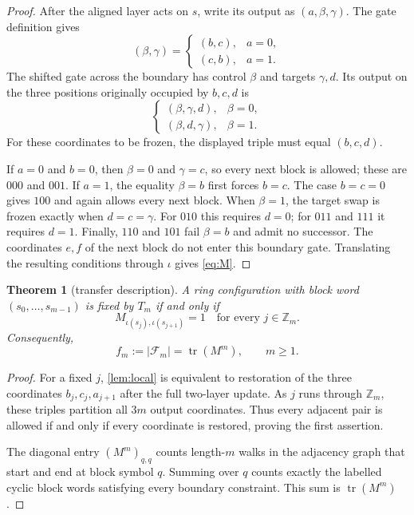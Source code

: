 \documentclass[11pt,a4paper]{amsart}
\newtheorem{theorem}{Theorem}[section]
\theoremstyle{definition}
\theoremstyle{remark}
\newcommand{\tr}{\operatorname{tr}}
\newcommand{\Fset}{\mathcal F}
\begin{document}
\begin{proof}
After the aligned layer acts on $s$, write its output as
$(a,\beta,\gamma)$.  The gate definition gives
\[
 (\beta,\gamma)=
 \begin{cases}
  (b,c),&a=0,\\
  (c,b),&a=1.
 \end{cases}
\]
The shifted gate across the boundary has control $\beta$ and targets
$\gamma,d$.  Its output on the three positions originally occupied by
$b,c,d$ is
\[
 \begin{cases}
  (\beta,\gamma,d),&\beta=0,\\
  (\beta,d,\gamma),&\beta=1.
 \end{cases}
\]
For these coordinates to be frozen, the displayed triple must equal
$(b,c,d)$.

If $a=0$ and $b=0$, then $\beta=0$ and $\gamma=c$, so every next block is
allowed; these are $000$ and $001$.  If $a=1$, the equality $\beta=b$
first forces $b=c$.  The case $b=c=0$ gives $100$ and again allows every
next block.  When $\beta=1$, the target swap is frozen exactly when
$d=c=\gamma$.  For $010$ this requires $d=0$; for $011$ and $111$ it
requires $d=1$.  Finally, $110$ and $101$ fail $\beta=b$ and admit no
successor.  The coordinates $e,f$ of the next block do not enter this
boundary gate.  Translating the resulting conditions through $\iota$ gives
\eqref{eq:M}.
\end{proof}

\begin{theorem}[transfer description]\label{thm:transfer}
A ring configuration with block word $(s_0,\ldots,s_{m-1})$ is fixed by
$T_m$ if and only if
\[
 M_{\iota(s_j),\iota(s_{j+1})}=1
 \quad\text{for every }j\in\mathbb Z_m.
\]
Consequently,
\begin{equation}\label{eq:trace}
 f_m:=|\Fset_m|=\tr(M^m),\qquad m\geq1.
\end{equation}
\end{theorem}

\begin{proof}
For a fixed $j$, \cref{lem:local} is equivalent to restoration of the three
coordinates $b_j,c_j,a_{j+1}$ after the full two-layer update.  As $j$ runs
through $\mathbb Z_m$, these triples partition all $3m$ output coordinates.
Thus every adjacent pair is allowed if and only if every coordinate is
restored, proving the first assertion.

The diagonal entry $(M^m)_{q,q}$ counts length-$m$ walks in the adjacency
graph that start and end at block symbol $q$.  Summing over $q$ counts
exactly the labelled cyclic block words satisfying every boundary
constraint.  This sum is $\tr(M^m)$.
\end{proof}
\end{document}
